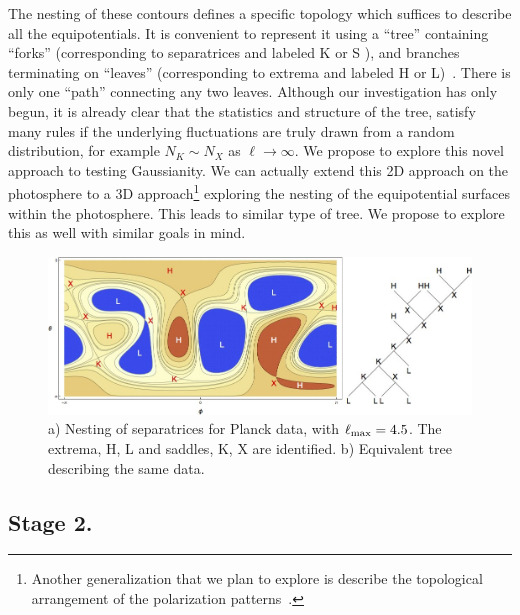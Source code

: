 \documentclass[psfig,12pt]{article}
\begin{document}
{The nesting of these contours defines a specific topology which suffices
to describe all the equipotentials. It is convenient to represent it
using a ``tree'' containing ``forks'' (corresponding to separatrices and
labeled K or S ), and branches terminating on ``leaves'' (corresponding
to extrema and labeled H or L)~\cite{west2001introduction}. There is
only one ``path'' connecting any two leaves. Although our investigation
has only begun, it is already clear that the statistics and structure of
the tree, satisfy many rules if the underlying fluctuations are truly
drawn from a random distribution, for example $N_K\sim N_X$ as
$\ell\rightarrow\infty$. We propose to explore this novel approach to
testing Gaussianity. We can actually extend this 2D approach on the
photosphere to a 3D approach\footnote{Another generalization that we
plan to explore is describe the topological arrangement of the
polarization patterns~\cite{Scheuer:1977}.} exploring the nesting of the
equipotential surfaces within the photosphere. This leads to similar
type of tree. We propose to explore this as well with similar goals in
mind.
\begin{figure}[t]
\centering\includegraphics[width=0.9\linewidth]{figures/nsffig5.jpg}
\caption{{\small a) Nesting of separatrices for Planck data, with
$\ell_{\rm max}=4.5$. The extrema, H, L and saddles, K, X are
identified. b) Equivalent tree describing the same data.}}
\end{figure}



\subsection{Stage 2.}

}
\end{document}
